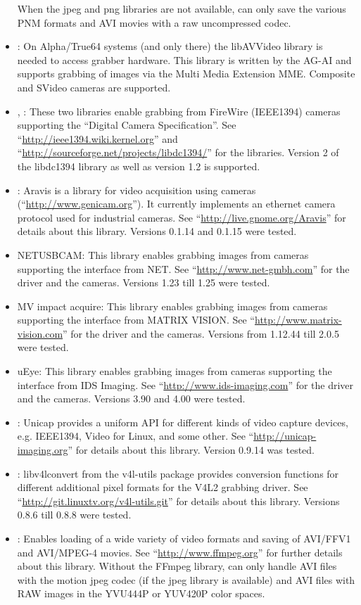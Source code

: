 \begin{itemize}
  When the jpeg and png libraries are not available, \icewing{} can
  only save the various PNM formats and AVI movies with a raw
  uncompressed codec.
\item {}: On Alpha/True64 systems (and only there)
  the libAVVideo library is needed to access grabber hardware. This
  library is written by the AG-AI and supports grabbing of images
  via the Multi Media Extension MME. Composite and SVideo cameras
  are supported.
\item {}, \label{page:libdc1394}:
  These two libraries enable grabbing from FireWire (IEEE1394)
  cameras supporting the ``Digital Camera Specification''. See
  ``\url{http://ieee1394.wiki.kernel.org}'' and
  ``\url{http://sourceforge.net/projects/libdc1394/}'' for the
  libraries. Version 2 of the libdc1394 library as well as version
  1.2 is supported.
\item {}: Aravis is a library
  for video acquisition using  cameras
  (``\url{http://www.genicam.org}''). It currently implements an
  ethernet camera protocol used for industrial cameras. See
  ``\url{http://live.gnome.org/Aravis}'' for details about this
  library. Versions 0.1.14 and 0.1.15 were tested.
\item {} NETUSBCAM: This library enables
  grabbing images from cameras supporting the interface from
  NET. See ``\url{http://www.net-gmbh.com}'' for the driver and the
  cameras. Versions 1.23 till 1.25 were tested.
\item {} MV impact acquire: This library enables
  grabbing images from cameras supporting the interface from MATRIX
  VISION. See ``\url{http://www.matrix-vision.com}'' for the driver
  and the cameras. Versions from 1.12.44 till 2.0.5 were tested.
\item {} uEye: This library enables grabbing images
  from cameras supporting the interface from IDS Imaging. See
  ``\url{http://www.ids-imaging.com}'' for the driver and the
  cameras. Versions 3.90 and 4.00 were tested.
\item {}: Unicap provides a uniform API for different
  kinds of video capture devices, e.g. IEEE1394, Video for Linux,
  and some other. See ``\url{http://unicap-imaging.org}'' for
  details about this library. Version 0.9.14 was tested.
\item {}: libv4lconvert from the v4l-utils
  package provides conversion functions for different additional
  pixel formats for the V4L2 grabbing driver. See
  ``\url{http://git.linuxtv.org/v4l-utils.git}'' for details about
  this library. Versions 0.8.6 till 0.8.8 were tested.
\item {}: Enables loading of a wide variety of video
  formats and saving of AVI/FFV1 and AVI/MPEG-4 movies. See
  ``\url{http://www.ffmpeg.org}'' for further details about this
  library. Without the FFmpeg library, \icewing{} can only handle
  AVI files with the motion jpeg codec (if the jpeg library is
  available) and AVI files with RAW images in the YVU444P or YUV420P
  color spaces.


\end{itemize}
